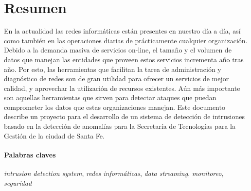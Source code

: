 \section*{Resumen}

En la actualidad las redes informáticas están presentes en nuestro día a día, así como también en las operaciones diarias de prácticamente cualquier organización. Debido a la demanda masiva de servicios on-line, el tamaño y el volumen de datos que manejan las entidades que proveen estos servicios incrementa año tras año. Por esto, las herramientas que facilitan la tarea de administración y diagnóstico de redes son de gran utilidad para ofrecer un servicios de mejor calidad, y aprovechar la utilización de recursos existentes. Aún más importante son aquellas herramientas que sirven para detectar ataques que puedan comprometer los datos que estas organizaciones manejan.
Este documento describe un proyecto para el desarrollo de un sistema de detección de intrusiones basado en la detección de anomalías para la Secretaría de Tecnologías para la Gestión de la ciudad de Santa Fe.

\paragraph{Palabras claves} \textit{intrusion detection system}, \textit{redes informáticas}, \textit{data streaming}, \textit{monitoreo}, \textit{seguridad}
\newpage